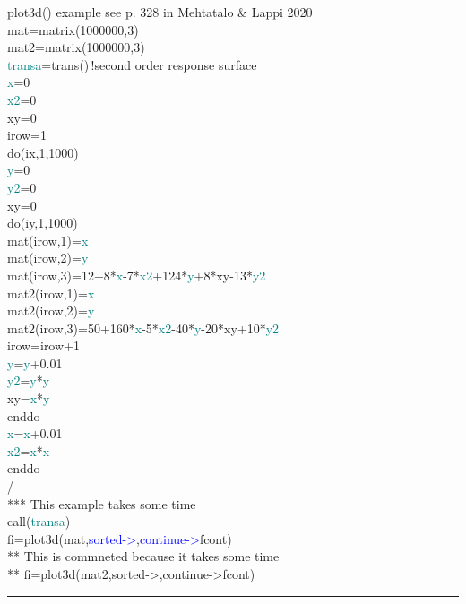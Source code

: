 \begin{example}plot3d() example see p.  328 in Mehtatalo & Lappi 2020\\ 
\label{plot3dex} 
\noindent mat=\textcolor{VioletRed}{matrix}(1000000,3)\\ 
mat2=\textcolor{VioletRed}{matrix}(1000000,3)\\ 
\textcolor{teal}{transa}=\textcolor{VioletRed}{trans}()\,{\color{ForestGreen}!second order response surface}\\ 
\textcolor{teal}{x}=0\\ 
\textcolor{teal}{x2}=0\\ 
xy=0\\ 
irow=1\\ 
\textcolor{VioletRed}{do}(ix,1,1000)\\ 
\textcolor{teal}{y}=0\\ 
\textcolor{teal}{y2}=0\\ 
xy=0\\ 
\textcolor{VioletRed}{do}(iy,1,1000)\\ 
mat(irow,1)=\textcolor{teal}{x}\\ 
mat(irow,2)=\textcolor{teal}{y}\\ 
mat(irow,3)=12+8*\textcolor{teal}{x}-7*\textcolor{teal}{x2}+124*\textcolor{teal}{y}+8*xy-13*\textcolor{teal}{y2}\\ 
mat2(irow,1)=\textcolor{teal}{x}\\ 
mat2(irow,2)=\textcolor{teal}{y}\\ 
mat2(irow,3)=50+160*\textcolor{teal}{x}-5*\textcolor{teal}{x2}-40*\textcolor{teal}{y}-20*xy+10*\textcolor{teal}{y2}\\ 
irow=irow+1\\ 
\textcolor{teal}{y}=\textcolor{teal}{y}+0.01\\ 
\textcolor{teal}{y2}=\textcolor{teal}{y}*\textcolor{teal}{y}\\ 
xy=\textcolor{teal}{x}*\textcolor{teal}{y}\\ 
\textcolor{VioletRed}{enddo}\\ 
\textcolor{teal}{x}=\textcolor{teal}{x}+0.01\\ 
\textcolor{teal}{x2}=\textcolor{teal}{x}*\textcolor{teal}{x}\\ 
\textcolor{VioletRed}{enddo}\\ 
/                           \\ 
{\color{ForestGreen}*** This example takes some time}\\ 
\textcolor{VioletRed}{call}(\textcolor{teal}{transa})\\ 
fi=\textcolor{VioletRed}{plot3d}(mat,\textcolor{blue}{sorted->},\textcolor{blue}{continue->}fcont)\\ 
{\color{ForestGreen}** This is commneted because it takes some time}\\ 
{\color{ForestGreen}** fi=plot3d(mat2,sorted->,continue->fcont)}\\ 
\end{example} 
\vspace{-7mm} \rule{5cm}{0.1pt} 
\onehalfspacing 
 
